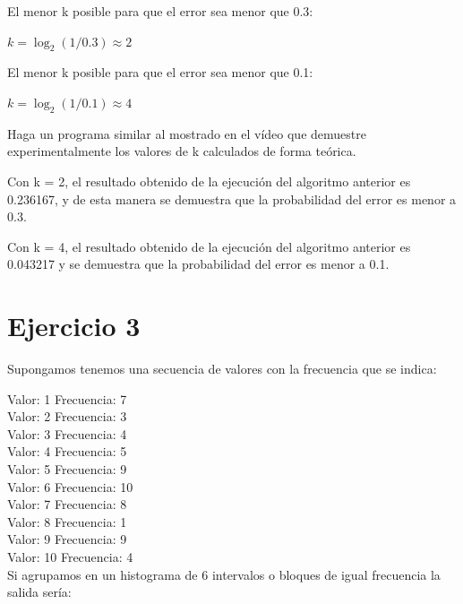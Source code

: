 \documentclass{uimppracticas}
\begin{document}
El menor k posible para que el error sea menor que 0.3:

\begin{center}
	$ k = \log_2(1/0.3) \approx 2 $
\end{center}

El menor k posible para que el error sea menor que 0.1:

\begin{center}
	$ k = \log_2(1/0.1) \approx 4 $
\end{center}

Haga un programa similar al mostrado en el vídeo que demuestre experimentalmente los valores de k calculados de forma teórica.



\newpage

Con k = 2, el resultado obtenido de la ejecución del algoritmo anterior es 0.236167, y de esta manera se demuestra que la probabilidad del error es menor a 0.3.

Con k = 4, el resultado obtenido de la ejecución del algoritmo anterior es 0.043217 y se demuestra que la probabilidad del error es menor a 0.1.

\section{Ejercicio 3}

Supongamos tenemos una secuencia de valores con la frecuencia que se indica:

Valor: 1 Frecuencia: 7\\
Valor: 2 Frecuencia: 3\\
Valor: 3 Frecuencia: 4\\
Valor: 4 Frecuencia: 5\\
Valor: 5 Frecuencia: 9\\
Valor: 6 Frecuencia: 10\\
Valor: 7 Frecuencia: 8\\
Valor: 8 Frecuencia: 1\\
Valor: 9 Frecuencia: 9\\
Valor: 10 Frecuencia: 4\\

Si agrupamos en un histograma de 6 intervalos o bloques de igual frecuencia la salida sería:
\end{document}
